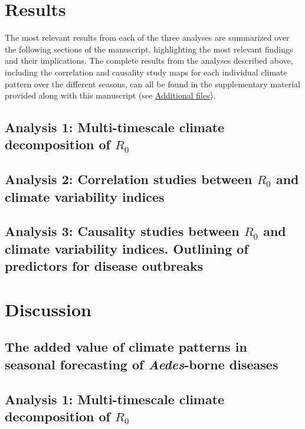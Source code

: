 \documentclass[10pt,twocolumn]{wlscirep}
\begin{document}
\section{Results}

The most relevant results from each of the three analyses are summarized over the following sections of the manuscript, highlighting the most relevant findings and their implications. The complete results from the analyses described above, including the correlation and causality study maps for each individual climate pattern over the different seasons, can all be found in the supplementary material provided along with this manuscript (see \hyperref[sec-additional-files]{Additional files}).


\subsection{Analysis 1: Multi-timescale climate decomposition of $R_0$} \label{sec-results-1}



\subsection{Analysis 2: Correlation studies between $R_0$ and climate variability indices} \label{sec-results-2} \label{sec-results-2}

\subsection{Analysis 3: Causality studies between $R_0$ and climate variability indices. Outlining of predictors for disease outbreaks} \label{sec-results-3}

\section{Discussion} \label{sec-discussion}

\subsection{The added value of climate patterns in seasonal forecasting of \textit{Aedes}-borne diseases} \label{sec-discussion-added-value}

\subsection{Analysis 1: Multi-timescale climate decomposition of $R_0$} \label{sec-discussion-analysis-1}
\end{document}
